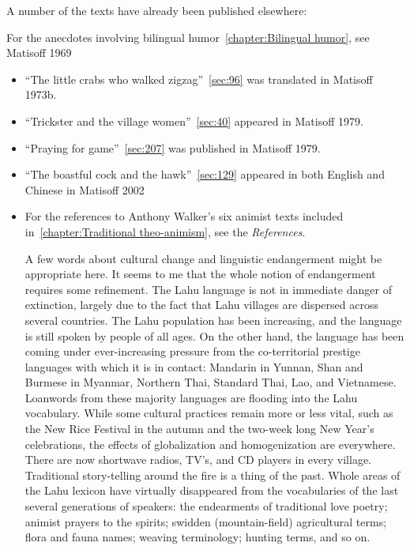 A number of the texts have already been published elsewhere:

For the anecdotes involving bilingual humor~\ref{chapter:Bilingual humor}, see Matisoff 1969

\begin{itemize}
\item ``The little crabs who walked zigzag''~\ref{sec:96} was
  translated in Matisoff 1973b.

\item ``Trickster and the village women''~\ref{sec:40} appeared in
  Matisoff 1979.

\item ``Praying for game''~\ref{sec:207} was published in Matisoff
  1979.

\item ``The boastful cock and the hawk''~\ref{sec:129} appeared in
  both English and Chinese in Matisoff 2002

\item For the references to Anthony Walker's six animist texts
  included in~\ref{chapter:Traditional theo-animism}, see the
  \emph{References}.

A few words about cultural change and linguistic endangerment might be
appropriate here. It seems to me that the whole notion of endangerment
requires some refinement. The Lahu language is not in immediate
danger of extinction, largely due to the fact that Lahu villages are
dispersed across several countries. The Lahu population has been
increasing, and the language is still spoken by people of all ages. On
the other hand, the language has been coming under ever-increasing
pressure from the co-territorial prestige languages with which it is in
contact: Mandarin in Yunnan, Shan and Burmese in Myanmar, Northern Thai,
Standard Thai, Lao, and Vietnamese. Loanwords from these majority
languages are flooding into the Lahu vocabulary. While some cultural
practices remain more or less vital, such as the New Rice Festival in
the autumn and the two-week long New Year's celebrations, the effects of
globalization and homogenization are everywhere. There are now shortwave
radios, TV's, and CD players in every village. Traditional story-telling
around the fire is a thing of the past. Whole areas of the Lahu lexicon
have virtually disappeared from the vocabularies of the last several
generations of speakers: the endearments of traditional love poetry;
animist prayers to the spirits; swidden (mountain-field) agricultural
terms; flora and fauna names; weaving terminology; hunting terms, and so
on.


\end{itemize}
